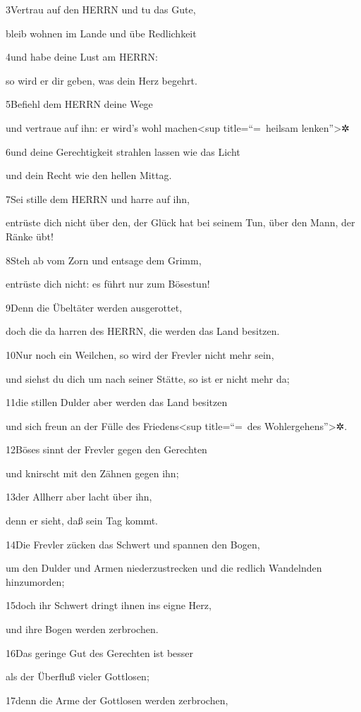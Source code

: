 3Vertrau auf den HERRN und tu das Gute,

bleib wohnen im Lande und übe Redlichkeit

4und habe deine Lust am HERRN:

so wird er dir geben, was dein Herz begehrt.

5Befiehl dem HERRN deine Wege

und vertraue auf ihn: er wird's wohl machen\textless sup
title=``=~heilsam lenken''\textgreater✲

6und deine Gerechtigkeit strahlen lassen wie das Licht

und dein Recht wie den hellen Mittag.

7Sei stille dem HERRN und harre auf ihn,

entrüste dich nicht über den, der Glück hat bei seinem Tun, über den
Mann, der Ränke übt!

8Steh ab vom Zorn und entsage dem Grimm,

entrüste dich nicht: es führt nur zum Bösestun!

9Denn die Übeltäter werden ausgerottet,

doch die da harren des HERRN, die werden das Land besitzen.

10Nur noch ein Weilchen, so wird der Frevler nicht mehr sein,

und siehst du dich um nach seiner Stätte, so ist er nicht mehr da;

11die stillen Dulder aber werden das Land besitzen

und sich freun an der Fülle des Friedens\textless sup title=``=~des
Wohlergehens''\textgreater✲.

12Böses sinnt der Frevler gegen den Gerechten

und knirscht mit den Zähnen gegen ihn;

13der Allherr aber lacht über ihn,

denn er sieht, daß sein Tag kommt.

14Die Frevler zücken das Schwert und spannen den Bogen,

um den Dulder und Armen niederzustrecken und die redlich Wandelnden
hinzumorden;

15doch ihr Schwert dringt ihnen ins eigne Herz,

und ihre Bogen werden zerbrochen.

16Das geringe Gut des Gerechten ist besser

als der Überfluß vieler Gottlosen;

17denn die Arme der Gottlosen werden zerbrochen,

